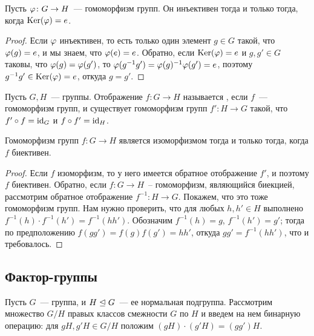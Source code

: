 \begin{lemma}\label{lem:injective_homo}
Пусть $\varphi\colon G\to H$~--- гомоморфизм групп. Он инъективен тогда и
только тогда, когда $\operatorname{Ker}(\varphi) = e$.
\end{lemma}
\begin{proof}
Если $\varphi$ инъективен, то есть только один элемент $g\in G$ такой, что
$\varphi(g) =e$, и мы знаем, что $\varphi(e)=e$.
Обратно, если $\operatorname{Ker}(\varphi)=e$ и $g,g'\in G$ таковы, что
$\varphi(g)=\varphi(g')$, то $\varphi(g^{-1}g') = \varphi(g)^{-1}\varphi(g') = e$, поэтому
$g^{-1}g'\in\operatorname{Ker}(\varphi)=e$, откуда $g = g'$.
\end{proof}

\begin{definition}
Пусть $G, H$~--- группы. Отображение $f\colon G\to H$ называется
, если $f$~--- гомоморфизм групп, и существует
гомоморфизм групп $f'\colon H\to G$ такой, что $f'\circ f = \operatorname{id}_G$ и
$f\circ f' = \operatorname{id}_H$.
\end{definition}

\begin{lemma}\label{lem:bijective_group_homo}
Гомоморфизм групп $f\colon G\to H$ является изоморфизмом тогда и
только тогда, когда $f$ биективен.
\end{lemma}
\begin{proof}
Если $f$ изоморфизм, то у него имеется обратное отображение $f'$, и
поэтому $f$ биективен. Обратно, если $f\colon G\to H$~-- гомоморфизм,
являющийся биекцией, рассмотрим обратное отображение
$f^{-1}\colon H\to G$. Покажем, что это тоже гомоморфизм групп. Нам
нужно проверить, что для любых $h,h'\in H$ выполнено $f^{-1}(h)\cdot
f^{-1}(h') = f^{-1}(hh')$.
Обозначим $f^{-1}(h) = g$, $f^{-1}(h') = g'$; тогда по предположению
$f(gg') = f(g)f(g') = hh'$, откуда $gg'= f^{-1}(hh')$, что и
требовалось.
\end{proof}


\subsection{Фактор-группы}


Пусть $G$~--- группа, и $H\trianglelefteq G$~--- ее нормальная
подгруппа. Рассмотрим множество $G/H$ правых классов смежности $G$ по
$H$ и введем на нем бинарную операцию: для $gH, g'H\in G/H$ положим
$(gH)\cdot (g'H) = (gg')H$.

